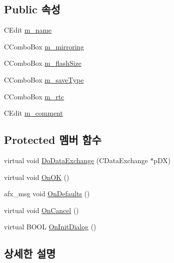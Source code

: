 \subsection*{Public 속성}
\begin{DoxyCompactItemize}
\item 
C\+Edit \mbox{\hyperlink{class_game_overrides_a5726c0df72b2d2f43ee641026409f026}{m\+\_\+name}}
\item 
C\+Combo\+Box \mbox{\hyperlink{class_game_overrides_a3aeea798546add267de2b8a59b4d6e0e}{m\+\_\+mirroring}}
\item 
C\+Combo\+Box \mbox{\hyperlink{class_game_overrides_a3f75d6a84d709bc9052eae826ae4b1c3}{m\+\_\+flash\+Size}}
\item 
C\+Combo\+Box \mbox{\hyperlink{class_game_overrides_ac56384b1ec6d9198db961d3d88e5bbc7}{m\+\_\+save\+Type}}
\item 
C\+Combo\+Box \mbox{\hyperlink{class_game_overrides_a68ff1f6bae098f28c5f7a30b90141781}{m\+\_\+rtc}}
\item 
C\+Edit \mbox{\hyperlink{class_game_overrides_a8fda5a63d4695c79b4bb430717a01daa}{m\+\_\+comment}}
\end{DoxyCompactItemize}
\subsection*{Protected 멤버 함수}
\begin{DoxyCompactItemize}
\item 
virtual void \mbox{\hyperlink{class_game_overrides_aa12ac9e6f357416fd5ae76a241bf3e95}{Do\+Data\+Exchange}} (C\+Data\+Exchange $\ast$p\+DX)
\item 
virtual void \mbox{\hyperlink{class_game_overrides_ab007ed7280044a2b07f162f430bb2a20}{On\+OK}} ()
\item 
afx\+\_\+msg void \mbox{\hyperlink{class_game_overrides_a5007baf79bb85e18fc2366b0d82c4e38}{On\+Defaults}} ()
\item 
virtual void \mbox{\hyperlink{class_game_overrides_a2bc2c17acb1982dafe3d376c84c369df}{On\+Cancel}} ()
\item 
virtual B\+O\+OL \mbox{\hyperlink{class_game_overrides_ace316fc35c2d3b36f7889752c03222a9}{On\+Init\+Dialog}} ()
\end{DoxyCompactItemize}


\subsection{상세한 설명}


